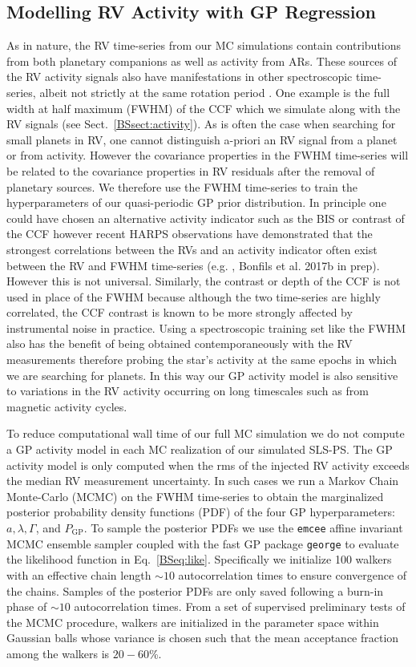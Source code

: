 \subsection{Modelling RV Activity with GP Regression} \label{BSsect:regression}
As in nature, the RV time-series from our MC simulations contain contributions from both planetary companions
as well as activity from ARs. These sources of the RV activity signals also have manifestations in other
spectroscopic time-series, albeit not strictly at the same rotation period \citep{hebrard16}. One example is the
full width at half maximum (FWHM) of the CCF which we simulate along with the RV signals (see Sect.~\ref{BSsect:activity}).
As is often the case when searching for small planets
in RV, one cannot distinguish a-priori an RV signal from a planet or from activity. However the covariance
properties in the FWHM time-series will be related to the covariance properties in RV residuals after the removal
of planetary sources. We therefore use the FWHM time-series to train the hyperparameters of our quasi-periodic
GP prior distribution. In principle one could have chosen an alternative activity indicator such as the BIS or
contrast of the CCF however recent HARPS observations have demonstrated that the strongest correlations between the RVs and
an activity indicator often exist between the RV and FWHM time-series 
(e.g. \citealt{astudillodefru17}, Bonfils et al. 2017b in prep). However
this is not universal. Similarly, the contrast or depth of the CCF is not used in place
of the FWHM because although the two time-series are highly correlated, the CCF contrast is known to be more strongly
affected by instrumental noise in practice.
Using a spectroscopic training set like the FWHM also has the benefit of being obtained contemporaneously with the
RV measurements therefore probing the star's activity at the same epochs in which we are searching for planets.
In this way our GP activity model is also sensitive to variations in the RV activity occurring on long timescales such as
from magnetic activity cycles.

To reduce computational wall time of our full MC simulation
we do not compute a GP activity model in each MC realization of our simulated
SLS-PS. The GP activity model is only computed when the rms of the injected RV activity exceeds the median RV measurement
uncertainty. In such cases we run a Markov Chain Monte-Carlo
(MCMC) on the FWHM time-series to obtain the marginalized posterior probability density functions (PDF)
of the four GP hyperparameters: $a,\lambda,\Gamma$, and $P_{\text{GP}}$.
To sample the posterior PDFs we use the \texttt{emcee} affine invariant
MCMC ensemble sampler \citep{foremanmackey13} coupled with the fast GP package \texttt{george} 
\citep{ambikasaran15} to evaluate the likelihood function in Eq.~\ref{BSeq:like}.
Specifically we initialize 100 walkers with an effective chain length
$\sim 10$ autocorrelation times to ensure convergence of the chains.
Samples of the posterior PDFs are only saved following a burn-in phase of $\sim 10$ autocorrelation times.
From a set of supervised preliminary tests of the MCMC procedure, walkers are initialized in the
parameter space within Gaussian balls whose variance is chosen such that the mean acceptance fraction among
the walkers is $20-60$\%.

